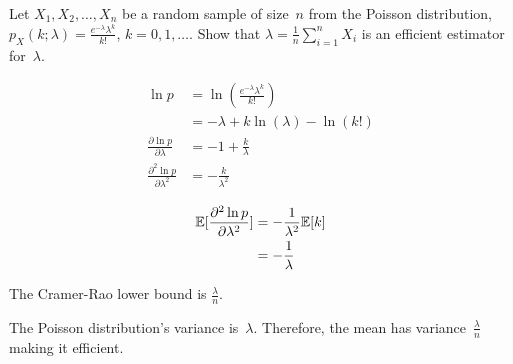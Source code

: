\begin{problem}
  Let ${X_1,X_2,\ldots,X_n}$ be a random sample of size~$n$ from the Poisson distribution, ${p_{X}(k;\lambda) = \frac{e^{-\lambda} \lambda^{k}}{k!}}$, ${k=0,1,\ldots}$. Show that ${\hat{\lambda} = \frac{1}{n} \sum_{i=1}^{n} X_i}$ is an efficient estimator for~$\lambda$.
\end{problem}

\begin{align}
  \ln p &= \ln \left( \frac{e^{-\lambda} \lambda^{k}}{k!} \right) \\
        &= -\lambda + k\ln(\lambda) - \ln(k!) \\
  \frac{\partial \ln p}{\partial \lambda} &= -1 +\frac{k}{\lambda} \\
  \frac{\partial^2 \ln p}{\partial \lambda^2} &= -\frac{k}{\lambda^2}
\end{align}

\begin{align}
  \mathbb{E}\lbrack\frac{\partial^2 \ln p}{\partial \lambda^2}\rbrack &= -\frac{1}{\lambda^2} \mathbb{E}\lbrack k\rbrack \\
                                                       &= -\frac{1}{\lambda}
\end{align}

The Cramer-Rao lower bound is ${\boxed{\frac{\lambda}{n}}}$.

The Poisson distribution's variance is~$\lambda$.  Therefore, the mean has variance~${\frac{\lambda}{n}}$ making it efficient.
